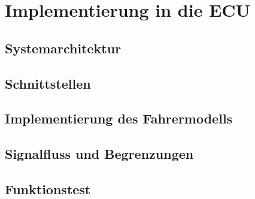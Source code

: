 \chapter{Implementierung in die ECU}

\section{Systemarchitektur}

\section{Schnittstellen}

\section{Implementierung des Fahrermodells}

\section{Signalfluss und Begrenzungen}

\section{Funktionstest}